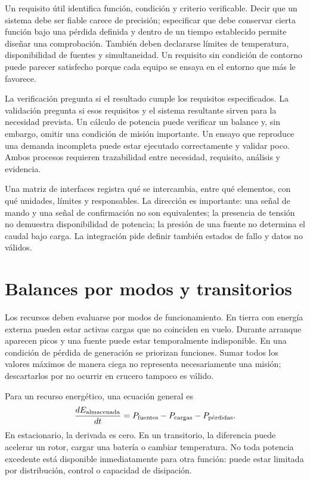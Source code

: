 Un requisito útil identifica función, condición y criterio verificable. Decir que un sistema debe ser fiable carece de precisión; especificar que debe conservar cierta función bajo una pérdida definida y dentro de un tiempo establecido permite diseñar una comprobación. También deben declararse límites de temperatura, disponibilidad de fuentes y simultaneidad. Un requisito sin condición de contorno puede parecer satisfecho porque cada equipo se ensaya en el entorno que más le favorece.

La verificación pregunta si el resultado cumple los requisitos especificados. La validación pregunta si esos requisitos y el sistema resultante sirven para la necesidad prevista. Un cálculo de potencia puede verificar un balance y, sin embargo, omitir una condición de misión importante. Un ensayo que reproduce una demanda incompleta puede estar ejecutado correctamente y validar poco. Ambos procesos requieren trazabilidad entre necesidad, requisito, análisis y evidencia.

Una matriz de interfaces registra qué se intercambia, entre qué elementos, con qué unidades, límites y responsables. La dirección es importante: una señal de mando y una señal de confirmación no son equivalentes; la presencia de tensión no demuestra disponibilidad de potencia; la presión de una fuente no determina el caudal bajo carga. La integración pide definir también estados de fallo y datos no válidos.

\section{Balances por modos y transitorios}
Los recursos deben evaluarse por modos de funcionamiento. En tierra con energía externa pueden estar activas cargas que no coinciden en vuelo. Durante arranque aparecen picos y una fuente puede estar temporalmente indisponible. En una condición de pérdida de generación se priorizan funciones. Sumar todos los valores máximos de manera ciega no representa necesariamente una misión; descartarlos por no ocurrir en crucero tampoco es válido.

Para un recurso energético, una ecuación general es
\begin{equation}
 \frac{dE_{\rm almacenada}}{dt}=P_{\rm fuentes}-P_{\rm cargas}-P_{\text{pérdidas}}.
\end{equation}
En estacionario, la derivada es cero. En un transitorio, la diferencia puede acelerar un rotor, cargar una batería o cambiar temperatura. No toda potencia excedente está disponible inmediatamente para otra función: puede estar limitada por distribución, control o capacidad de disipación.

